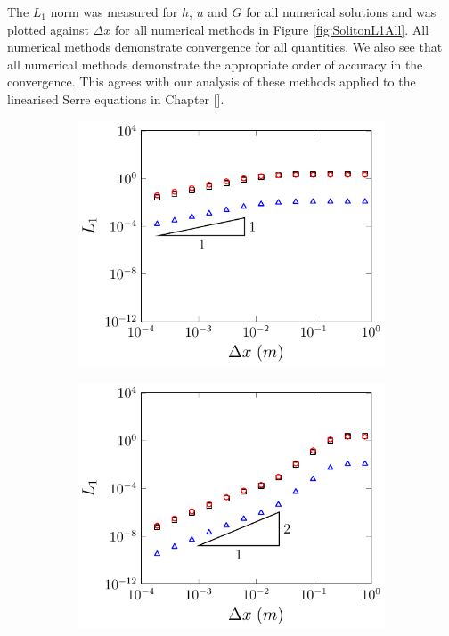 The $L_1$ norm was measured for $h$, $u$ and $G$ for all numerical solutions and was plotted against $\Delta x$ for all numerical methods in Figure \ref{fig:SolitonL1All}. All numerical methods demonstrate convergence for all quantities. We also see that all numerical methods demonstrate the appropriate order of accuracy in the convergence. This agrees with our analysis of these methods applied to the linearised Serre equations in Chapter []. 
\begin{figure}
	\centering
	\begin{subfigure}{0.5\textwidth}
		\includegraphics[width=\textwidth]{./chp5/figures/Analytic/Soliton/L1/FDVM1.pdf}
		\vspace{0.5cm}
	\end{subfigure}%
	\begin{subfigure}{0.5\textwidth}
		\includegraphics[width=\textwidth]{./chp5/figures/Analytic/Soliton/L1/FDVM2.pdf}

\end{subfigure}
\end{figure}
